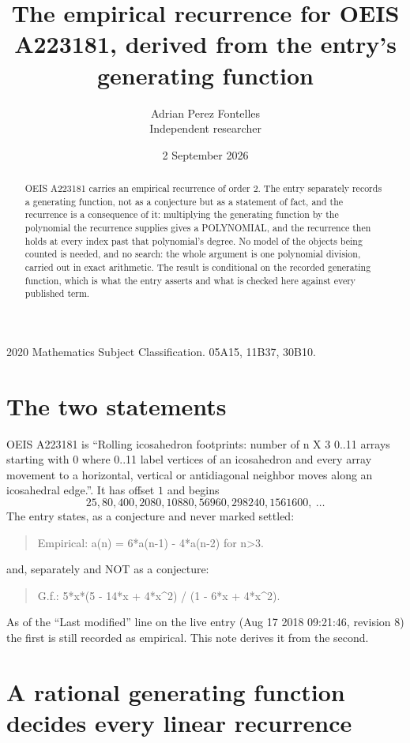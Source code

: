 \documentclass[11pt,a4paper]{article}
\title{The empirical recurrence for OEIS A223181, derived from the entry's generating function}
\author{Adrian Perez Fontelles\\ \small Independent researcher}
\date{2 September 2026}
\theoremstyle{plain}
\theoremstyle{definition}
\begin{document}
\maketitle

\begin{abstract}
OEIS A223181 carries an empirical recurrence of order $2$. The entry separately records a
generating function, not as a conjecture but as a statement of fact, and the recurrence is a
consequence of it: multiplying the generating function by the polynomial the recurrence
supplies gives a POLYNOMIAL, and the recurrence then holds at every index past that
polynomial's degree. No model of the objects being counted is needed, and no search: the
whole argument is one polynomial division, carried out in exact arithmetic. The result is
conditional on the recorded generating function, which is what the entry asserts and what is
checked here against every published term.
\end{abstract}

\noindent\small 2020 Mathematics Subject Classification. 05A15, 11B37, 30B10.\normalsize

\section{The two statements}

OEIS A223181 is ``Rolling icosahedron footprints: number of n X 3 0..11 arrays starting with 0 where 0..11 label vertices of an icosahedron and every array movement to a horizontal, vertical or antidiagonal neighbor moves along an icosahedral edge.''. It has offset $1$ and begins
\[
25, 80, 400, 2080, 10880, 56960, 298240, 1561600,\ \dots
\]
The entry states, as a conjecture and never marked settled:
\begin{quote}
Empirical: a(n) = 6*a(n-1) - 4*a(n-2) for n>3.
\end{quote}
and, separately and NOT as a conjecture:
\begin{quote}
G.f.: 5*x*(5 - 14*x + 4*x\^{}2) / (1 - 6*x + 4*x\^{}2).
\end{quote}
As of the ``Last modified'' line on the live entry (Aug 17 2018 09:21:46, revision 8) the first is still
recorded as empirical. This note derives it from the second.

\section{A rational generating function decides every linear recurrence}
\end{document}
